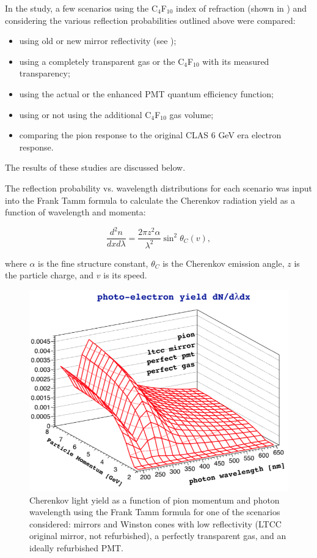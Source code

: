 In the study, a few scenarios using the C$_4$F$_{10}$ index of refraction (shown in )
and considering the various reflection probabilities outlined above  were compared:

\begin{itemize}
	\item using old or new mirror reflectivity (see );
	\item using a completely transparent gas or the C$_4$F$_{10}$ with its measured transparency;
	\item using the actual or the enhanced PMT quantum efficiency function;
	\item using or not using the additional C$_4$F$_{10}$ gas volume;
	\item comparing the pion response to the original CLAS 6 GeV era electron response.
\end{itemize}
\noindent
The results of these studies are discussed below.

The reflection probability vs. wavelength distributions for each scenario was input into the Frank\textendash
Tamm formula \cite{Frank:1937fk} to calculate the Cherenkov radiation yield as a function of wavelength and
momenta:

\begin{equation}
  \label{eq:cerenkov}
  \frac{d^2n}{dxd\lambda} = \frac{2\pi z^2\alpha}{\lambda^2}\sin^2{\theta_C(v)},
\end{equation}

\noindent
where $\alpha$ is the fine structure constant, $\theta_C$ is the Cherenkov emission angle, $z$ is the particle
charge, and $v$ is its speed.

\begin{figure}
	\centering
	\includegraphics[width=0.98\columnwidth, height=0.75\columnwidth]{img/photonYieldStudy.png}
	\caption{Cherenkov light yield as a function of pion momentum and photon wavelength using the Frank\textendash
          Tamm formula for one of the scenarios considered: mirrors and Winston cones with low reflectivity (LTCC
          original mirror, not refurbished), a perfectly transparent gas, and an ideally refurbished PMT.}
	\label{fig:photonYieldStudy}
\end{figure}

